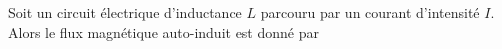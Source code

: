 ﻿\documentclass[a4paper]{article}
\begin{document}
\pagestyle{fancy}
\fancyhf{}
\setlength{\headheight}{15pt}

\begin{center}
	\large{}
\end{center}


Soit un circuit électrique d'inductance \(L\) parcouru par un courant d'intensité \(I\).\\
Alors le flux magnétique auto-induit est donné par \begin{center}\end{center}
\end{document}
